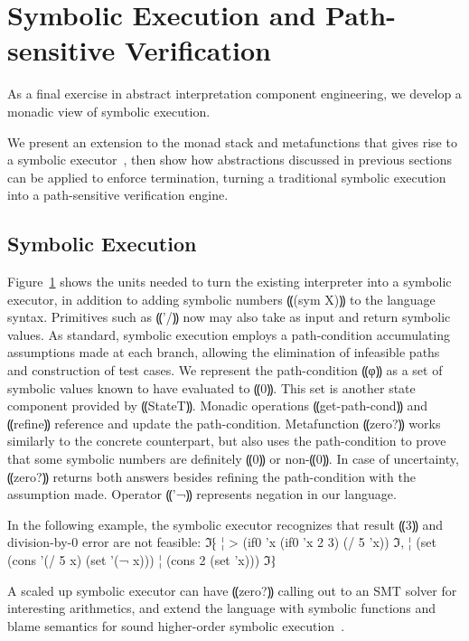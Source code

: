 \section{Symbolic Execution and Path-sensitive Verification}\label{s:symbolic}

As a final exercise in abstract interpretation component engineering, we
develop a monadic view of symbolic execution.

We present an extension to the monad stack and metafunctions that gives rise to
a symbolic executor~\cite{dvanhorn:King1976Symbolic}, then show how
abstractions discussed in previous sections can be applied to enforce
termination, turning a traditional symbolic execution into a path-sensitive
verification engine.

\subsection{Symbolic Execution}
Figure~\ref{s:symbolic} shows the units needed to turn the existing interpreter
into a symbolic executor, in addition to adding symbolic numbers ⸨(sym X)⸩
to the language syntax.
Primitives such as ⸨'/⸩ now may also take as input
and return symbolic values.
As standard, symbolic execution employs a path-condition
accumulating assumptions made at each branch,
allowing the elimination of infeasible paths and construction of test cases.
We represent the path-condition ⸨φ⸩ as a set of symbolic values
known to have evaluated to ⸨0⸩.
This set is another state component provided by ⸨StateT⸩.
Monadic operations ⸨get-path-cond⸩
and ⸨refine⸩ reference and update the path-condition.
Metafunction ⸨zero?⸩ works similarly to the concrete counterpart,
but also uses the path-condition to prove that some symbolic numbers
are definitely ⸨0⸩ or non-⸨0⸩.
In case of uncertainty, ⸨zero?⸩ returns both answers
besides refining the path-condition with the assumption made.
Operator ⸨'¬⸩ represents negation in our language.

In the following example, the symbolic executor recognizes that
result ⸨3⸩ and division-by-0 error are not feasible:
ℑ⁅
¦ > (if0 'x (if0 'x 2 3) (/ 5 'x))
ℑ,
¦ (set (cons '(/ 5 x) (set '(¬ x)))
¦      (cons 2 (set 'x)))
ℑ⁆

A scaled up symbolic executor can have ⸨zero?⸩ calling out
to an SMT solver for interesting arithmetics,
and extend the language with symbolic functions
and blame semantics for sound higher-order symbolic
execution~\cite{dvanhorn:TobinHochstadt2012Higherorder,dvanhorn:Nguyen2015Relatively}.

